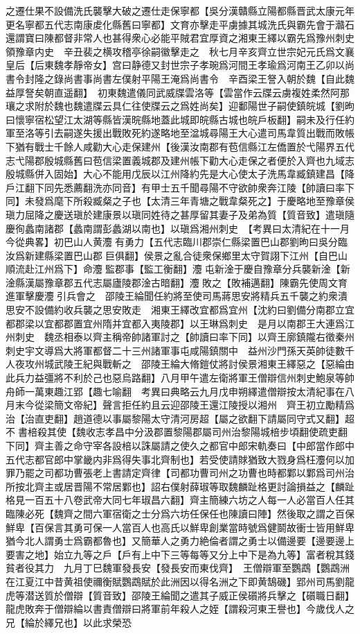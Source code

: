 之遷仕果不設備洗氏襲擊大破之遷仕走保寧都【吳分漢贛縣立陽都縣晋武太康元年更名寧都五代志南康䖍化縣舊曰寧都】文育亦擊走平虜據其城洗氏與霸先會于灨石還謂寶曰陳都督非常人也甚得衆心必能平賊君宜厚資之湘東王繹以霸先爲豫州刺史領豫章内史　辛丑裴之横攻稽亭徐嗣徽擊走之　秋七月辛亥齊立世宗妃元氏爲文襄皇后【后東魏孝靜帝女】宫曰静德又封世宗子孝琬爲河間王孝瑜爲河南王乙卯以尚書令封隆之錄尚書事尚書左僕射平陽王淹爲尚書令　辛酉梁王詧入朝於魏【自此魏益厚詧矣朝直遥翻】　初東魏遣儀同武威牒雲洛等【雲當作云牒云虜複姓柔然阿那瓖之求附於魏也魏遣牒云具仁往使牒云之爲姓尚矣】迎鄱陽世子嗣使鎮皖城【劉昫曰懷寧宿松望江太湖等縣皆漢晥縣地蓋此城即皖縣古城也皖戶板翻】嗣未及行任約軍至洛等引去嗣遂失援出戰敗死約遂略地至湓城尋陽王大心遣司馬韋質出戰而敗帳下猶有戰士千餘人咸勸大心走保建州【後漢汝南郡有苞信縣江左僑置於弋陽界五代志弋陽郡殷城縣舊曰苞信梁置義城郡及建州帳下勸大心走保之者便於入齊也九域志殷城縣併入固始】大心不能用戊辰以江州降約先是大心使太子洗馬韋臧鎮建昌【降戶江翻下同先悉薦翻洗亦同音】有甲士五千聞尋陽不守欲帥衆奔江陵【帥讀曰率下同】未發爲麾下所殺臧粲之子也【太清三年青塘之戰韋粲死之】于慶略地至豫章侯瑱力屈降之慶送瑱於建康景以瑱同姓待之甚厚留其妻子及弟為質【質音致】遣瑱隨慶徇蠡南諸郡【蠡南謂彭蠡湖以南也】以瑱爲湘州刺史　【考異曰太清紀在十一月今從典畧】初巴山人黄灋有勇力【五代志臨川郡崇仁縣梁置巴山郡劉昫曰吳分臨汝爲新建縣梁置巴山郡巨俱翻】侯景之亂合徒衆保鄉里太守賀詡下江州【自巴山順流赴江州爲下】命灋監郡事【監工衡翻】灋屯新淦于慶自豫章分兵襲新淦【新淦縣漢屬豫章郡五代志屬廬陵郡淦古暗翻】灋敗之【敗補邁翻】陳霸先使周文育進軍擊慶灋引兵會之　邵陵王綸聞任約將至使司馬蔣思安將精兵五千襲之約衆潰思安不設備約收兵襲之思安敗走　湘東王繹改宜都爲宜州【沈約曰劉備分南郡立宜都郡梁以宜都郡置宜州隋并宜都入夷陵郡】以王琳爲刺史　是月以南郡王大連爲江州刺史　魏丞相泰以齊主稱帝帥諸軍討之【帥讀曰率下同】以齊王廓鎮隴右徵秦州刺史宇文導爲大將軍都督二十三州諸軍事屯咸陽鎮關中　益州沙門孫天英帥徒數千人夜攻州城武陵王紀與戰斬之　邵陵王綸大脩鎧仗將討侯景湘東王繹惡之【惡綸由此兵力益彊將不利於己也惡烏路翻】八月甲午遣左衛將軍王僧辯信州刺史鮑泉等帥舟師一萬東趣江郢【趣七喻翻　考異曰典略云九月戊申朔繹遣僧辯按太清紀事在八月末今從梁簡文帝紀】聲言拒任約且云迎邵陵王還江陵授以湘州　齊王初立勵精爲治【治直吏翻】趙道德以事屬黎陽太守清河房超【屬之欲翻下請屬同守式又翻】超不書棓殺其使【魏收志孝昌中分汲郡置黎陽郡屬司州治黎陽城棓步頃翻使疏吏翻下同】齊主善之命守宰各設棓以誅屬請之使久之都官中郎宋軌奏曰【中郎當作郎中五代志都官郎中掌畿内非爲得失事北齊制也】若受使請賕猶致大戮身爲枉灋何以加罪乃罷之司都功曹張老上書請定齊律【司都功曹司州之功曹也時都鄴以鄴爲司州治所按北齊主或居晋陽不常居鄴也】詔右僕射薛琡等取魏麟趾格更討論損益之【麟趾格見一百五十八卷武帝大同七年琡昌六翻】齊主簡練六坊之人每一人必當百人任其臨陳必死【魏齊之間六軍宿衛之士分爲六坊任保任也陳讀曰陣】然後取之謂之百保鮮卑【百保言其勇可保一人當百人也高氏以鮮卑創業當時號爲健鬬故衝士皆用鮮卑猶今北人謂勇士爲霸都魯也】又簡華人之勇力絶倫者謂之勇士以備邊要【邊要邊上要害之地】始立九等之戶【戶有上中下三等每等又分上中下是為九等】富者稅其錢貧者役其力　九月丁巳魏軍發長安【發長安而東伐齊】　王僧辯軍至鸚鵡【鸚鵡洲在江夏江中昔黄祖使禰衡賦鸚鵡賦於此洲因以得名洲之下即黄鵠磯】郢州司馬劉龍虎等潜送質於僧辯【質音致】邵陵王綸聞之遣其子威正侯礩將兵擊之【礩職日翻】龍虎敗奔于僧辯綸以書責僧辯曰將軍前年殺人之姪【謂殺河東王譽也】今歲伐人之兄【綸於繹兄也】以此求榮恐